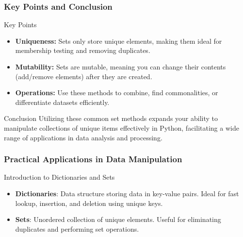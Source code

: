 \documentclass{beamer}
\begin{document}
\begin{frame}
    \frametitle{Key Points and Conclusion}
    \begin{block}{Key Points}
        \begin{itemize}
            \item \textbf{Uniqueness:} Sets only store unique elements, making them ideal for membership testing and removing duplicates.
            \item \textbf{Mutability:} Sets are mutable, meaning you can change their contents (add/remove elements) after they are created.
            \item \textbf{Operations:} Use these methods to combine, find commonalities, or differentiate datasets efficiently.
        \end{itemize}
    \end{block}
    \begin{block}{Conclusion}
        Utilizing these common set methods expands your ability to manipulate collections of unique items effectively in Python, facilitating a wide range of applications in data analysis and processing.
    \end{block}
\end{frame}

\begin{frame}
    \frametitle{Practical Applications in Data Manipulation}
    \begin{block}{Introduction to Dictionaries and Sets}
        \begin{itemize}
            \item \textbf{Dictionaries}: Data structure storing data in key-value pairs. Ideal for fast lookup, insertion, and deletion using unique keys.
            \item \textbf{Sets}: Unordered collection of unique elements. Useful for eliminating duplicates and performing set operations.
        \end{itemize}
    \end{block}
\end{frame}
\end{document}
